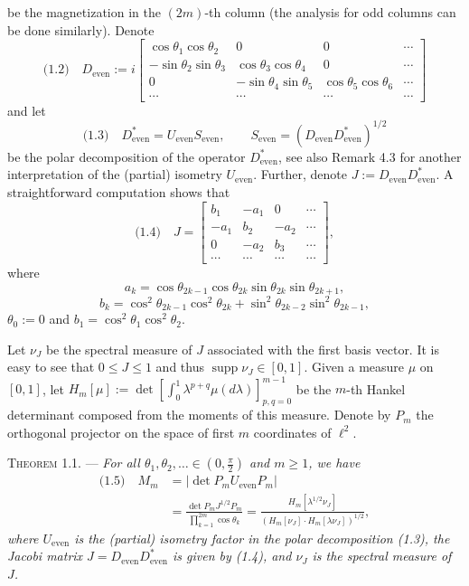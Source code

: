 \documentclass[11pt]{article}
\newcommand{\eql}[1]{\text{(#1)}\quad}
\newcommand{\Dev}{D_{\mathrm{even}}}
\newcommand{\Uev}{U_{\mathrm{even}}}
\newcommand{\Sev}{S_{\mathrm{even}}}
\begin{document}
be the magnetization in the $(2m)$-th column (the analysis for odd columns
can be done similarly). Denote
\[
\eql{1.2} \Dev := i
\begin{bmatrix}
\cos\theta_1\cos\theta_2 & 0 & 0 & \cdots\\
-\sin\theta_2\sin\theta_3 & \cos\theta_3\cos\theta_4 & 0 & \cdots\\
0 & -\sin\theta_4\sin\theta_5 & \cos\theta_5\cos\theta_6 & \cdots\\
\cdots & \cdots & \cdots & \cdots
\end{bmatrix}
\]
and let
\[
\eql{1.3} D_{\mathrm{even}}^{*} = \Uev \Sev,\qquad
\Sev = (\Dev D_{\mathrm{even}}^{*})^{1/2}
\]
be the polar decomposition of the operator $D_{\mathrm{even}}^{*}$, see also
Remark 4.3 for another interpretation of the (partial) isometry $\Uev$.
Further, denote $J := \Dev D_{\mathrm{even}}^{*}$. A straightforward
computation shows that
\[
\eql{1.4} J =
\begin{bmatrix}
b_1 & -a_1 & 0 & \cdots\\
-a_1 & b_2 & -a_2 & \cdots\\
0 & -a_2 & b_3 & \cdots\\
\cdots & \cdots & \cdots & \cdots
\end{bmatrix},
\]
where
\[
a_k = \cos\theta_{2k-1}\cos\theta_{2k}\sin\theta_{2k}\sin\theta_{2k+1},
\]
\[
b_k = \cos^2\theta_{2k-1}\cos^2\theta_{2k} + \sin^2\theta_{2k-2}\sin^2\theta_{2k-1},
\]
$\theta_0 := 0$ and $b_1 = \cos^2\theta_1\cos^2\theta_2$.

Let $\nu_J$ be the spectral measure of $J$ associated with the first basis
vector. It is easy to see that $0 \leqslant J \leqslant 1$ and thus
$\operatorname{supp}\nu_J \in [0,1]$. Given a measure $\mu$ on $[0,1]$, let
$H_m[\mu] := \det[\int_0^1\lambda^{p+q}\mu(d\lambda)]_{p,q=0}^{m-1}$ be the
$m$-th Hankel determinant composed from the moments of this measure. Denote
by $P_m$ the orthogonal projector on the space of first $m$ coordinates of
$\ell^2$.

\medskip
\noindent\textsc{Theorem 1.1.} --- \emph{For all $\theta_1,\theta_2,\dots \in
(0,\frac{\pi}{2})$ and $m \geqslant 1$, we have}
\begin{align*}
\eql{1.5} M_m &= |\det P_m \Uev P_m|\\
&= \frac{\det P_m J^{1/2}P_m}{\prod_{k=1}^{2m}\cos\theta_k}
= \frac{H_m[\lambda^{1/2}\nu_J]}{(H_m[\nu_J]\cdot H_m[\lambda\nu_J])^{1/2}},
\end{align*}
\emph{where $\Uev$ is the (partial) isometry factor in the polar
decomposition (1.3), the Jacobi matrix $J = \Dev D_{\mathrm{even}}^{*}$ is
given by (1.4), and $\nu_J$ is the spectral measure of $J$.}
\end{document}
